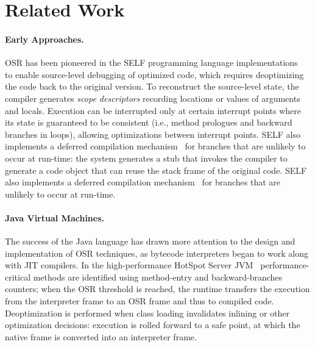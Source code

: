 
\section{Related Work}
\label{se:related}

\paragraph{Early Approaches.}

OSR has been pioneered in the SELF programming language implementations~\cite{holzle1992self} to enable source-level debugging of optimized code, which requires deoptimizing the code back to the original version. To reconstruct the source-level state, the compiler generates {\em scope descriptors} recording locations or values of arguments and locals. Execution can be interrupted only at certain interrupt points where its state is guaranteed to be consistent (i.e., method prologues and backward branches in loops), allowing optimizations between interrupt points.
\ifdefined \fullver
SELF also implements a deferred compilation mechanism~\cite{chambers1991self} for branches that are unlikely to occur at run-time: the system generates a stub that invokes the compiler to generate a code object that can reuse the stack frame of the original code.
\else
SELF also implements a deferred compilation mechanism~\cite{chambers1991self} for branches that are unlikely to occur at run-time.
\fi

\paragraph{Java Virtual Machines.}
The success of the Java language has drawn more attention to the design and implementation of OSR techniques, as bytecode interpreters began to work along with JIT compilers. In the high-performance HotSpot Server JVM~\cite{paleczny2001hotspot} performance-critical methods are identified using method-entry and backward-branches counters; when the OSR threshold is reached, the runtime transfers the execution from the interpreter frame to an OSR frame and thus to compiled code. Deoptimization is performed when class loading invalidates inlining or other optimization decisions: execution is rolled forward to a safe point, at which the native frame is converted into an interpreter frame.

